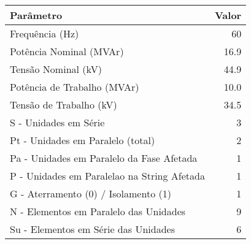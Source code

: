 \begin{tabular}{|l|r|}
\hline
\textbf{Parâmetro} & \textbf{Valor} \\ \hline
Frequência (Hz) & 60 \\  \hline
Potência Nominal (MVAr) & 16.9 \\  \hline
Tensão Nominal (kV) & 44.9 \\  \hline
Potência de Trabalho (MVAr) & 10.0 \\  \hline
Tensão de Trabalho (kV) & 34.5 \\  \hline
S  - Unidades em Série & 3 \\  \hline
Pt - Unidades em Paralelo (total) & 2 \\  \hline
Pa - Unidades em Paralelo da Fase Afetada & 1 \\  \hline
P  - Unidades em Paralelao na String Afetada & 1 \\  \hline
G  - Aterramento (0) / Isolamento (1) & 1 \\  \hline
N  - Elementos em Paralelo das Unidades & 9 \\  \hline
Su - Elementos em Série das Unidades & 6 \\  \hline
\end{tabular}